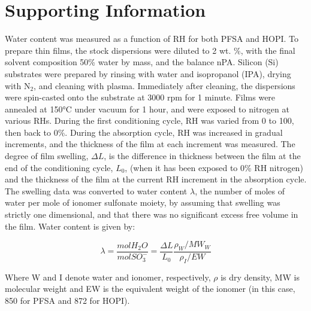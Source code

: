 \documentclass[12pt]{article}
\begin{document}
\doublespacing
\section*{Supporting Information}
Water content was measured as a function of RH for both PFSA and HOPI. To prepare thin films, the stock dispersions were diluted to 2 wt. \%, with the final solvent composition 50\% water by mass, and the balance nPA. Silicon (Si) substrates were prepared by rinsing with water and isopropanol (IPA), drying with N$_2$, and cleaning with plasma. Immediately after cleaning, the dispersions were spin-casted onto the substrate at 3000 rpm for 1 minute. Films were annealed at 150°C under vacuum for 1 hour, and were exposed to nitrogen at various RHs. During the first conditioning cycle, RH was varied from 0 to 100, then back to 0\%. During the absorption cycle, RH was increased in gradual increments, and the thickness of the film at each increment was measured. The degree of film swelling, $\Delta L$, is the difference in thickness between the film at the end of the conditioning cycle, $L_0$, (when it has been exposed to 0\% RH nitrogen) and the thickness of the film at the current RH increment in the absorption cycle. The swelling data was converted to water content $\lambda$, the number of moles of water per mole of ionomer sulfonate moiety, by assuming that swelling was strictly one dimensional, and that there was no significant excess free volume in the film. Water content is given by:

\begin{equation*}
\lambda = \frac{mol H_2O}{mol SO_3^-} = \frac{\Delta L}{L_0}\frac{\rho_W/MW_W}{\rho_I/EW}    
\end{equation*}

Where W and I denote water and ionomer, respectively, $\rho$ is dry density, MW is molecular weight and EW is the equivalent weight of the ionomer (in this case, 850 for PFSA and 872 for HOPI). 
\end{document}
